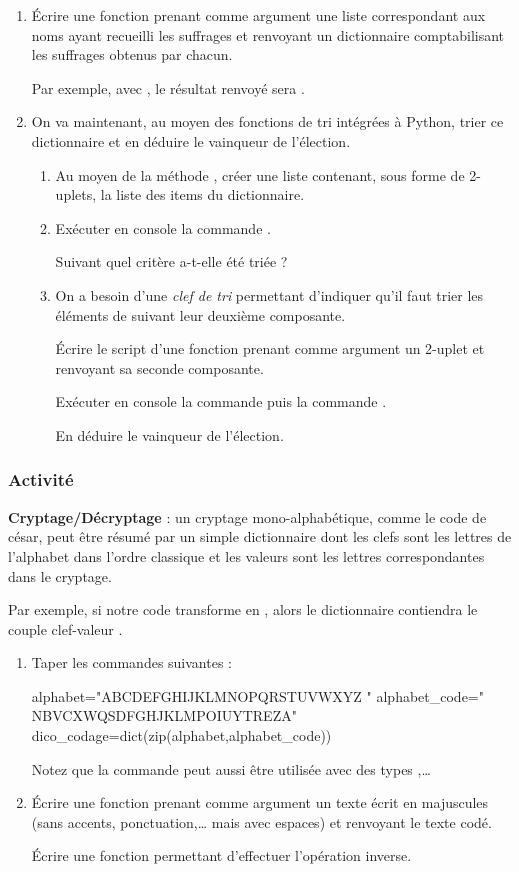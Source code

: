 \documentclass[11pt,a4paper,french,twoside]{PMCours}
\newcounter{activite}
\newcommand{\activite}{\subsubsection*{Activité~\refstepcounter{activite}\theactivite}}
\begin{document}
\begin{enumerate}
\item Écrire une fonction  prenant comme argument 
une liste  correspondant aux noms ayant recueilli les suffrages 
et renvoyant un dictionnaire comptabilisant les suffrages obtenus par chacun.

Par exemple, avec , 
le résultat renvoyé sera .

\item On va maintenant, au moyen des fonctions de tri intégrées à Python, 
trier ce dictionnaire et en déduire le vainqueur de l'élection.
\begin{enumerate}
\item Au moyen de la méthode , 
créer une liste  contenant, sous forme de 2-uplets, 
la liste des items du dictionnaire.
\item Exécuter en console la commande . 

Suivant quel critère  a-t-elle été triée ?
\item On a besoin d'une {\em clef de tri} permettant d'indiquer qu'il faut trier
les éléments de  suivant leur deuxième composante.

Écrire le script d'une fonction  prenant comme argument 
un 2-uplet  et renvoyant sa seconde composante.

Exécuter en console la commande  
puis la commande . 

En déduire le vainqueur de l'élection.

\end{enumerate}
\end{enumerate}

\activite 
\textbf{Cryptage/Décryptage} : 
un cryptage mono-alphabétique, comme le code de césar, 
peut être résumé par un simple dictionnaire 
dont les clefs sont les lettres de l'alphabet dans l'ordre classique 
et les valeurs sont les lettres correspondantes dans le cryptage.

Par exemple, si notre code transforme  en , 
alors le dictionnaire contiendra le couple clef-valeur .

\begin{enumerate}
\item Taper les commandes suivantes :
\begin{Python}%
alphabet="ABCDEFGHIJKLMNOPQRSTUVWXYZ "
alphabet_code=" NBVCXWQSDFGHJKLMPOIUYTREZA"
dico_codage=dict(zip(alphabet,alphabet_code))
\end{Python}%
Notez que la commande  peut aussi être utilisée 
avec des types ,\dots
\item Écrire une fonction  prenant comme argument 
un texte écrit en majuscules (sans accents, ponctuation,\dots{} mais avec espaces) 
et renvoyant le texte codé.

Écrire une fonction  permettant d'effectuer 
l'opération inverse.
\end{enumerate}
\end{document}
